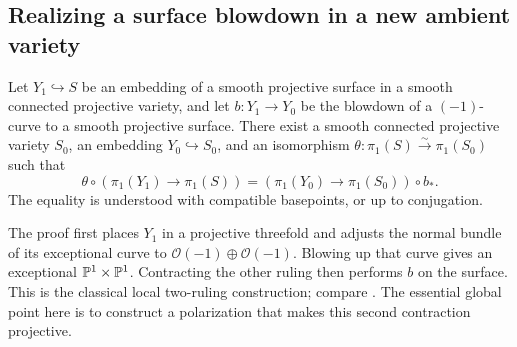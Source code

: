 \subsection{Realizing a surface blowdown in a new ambient variety}

\begin{lemma}\label{lem:ambient-blowdown}
Let $Y_1\hookrightarrow S$ be an embedding of a smooth projective
surface in a smooth connected projective variety, and let
$b:Y_1\to Y_0$ be the blowdown of a $(-1)$-curve to a smooth projective
surface.  There exist a smooth connected projective variety $S_0$, an
embedding $Y_0\hookrightarrow S_0$, and an isomorphism
$\theta:\pi_1(S)\xrightarrow{\sim}\pi_1(S_0)$ such that
\[
 \theta\circ(\pi_1(Y_1)\to\pi_1(S))
 = (\pi_1(Y_0)\to\pi_1(S_0))\circ b_*.
\]
The equality is understood with compatible basepoints, or up to
conjugation.
\end{lemma}

The proof first places $Y_1$ in a projective threefold and adjusts the
normal bundle of its exceptional curve to
$\mathcal O(-1)\oplus\mathcal O(-1)$.  Blowing up that curve gives an
exceptional $\mathbb P^1\times\mathbb P^1$.  Contracting the other ruling then
performs $b$ on the surface.  This is the classical local two-ruling
construction; compare \cite{Atiyah1958}.  The essential global point
here is to construct a polarization that makes this second contraction
projective.

